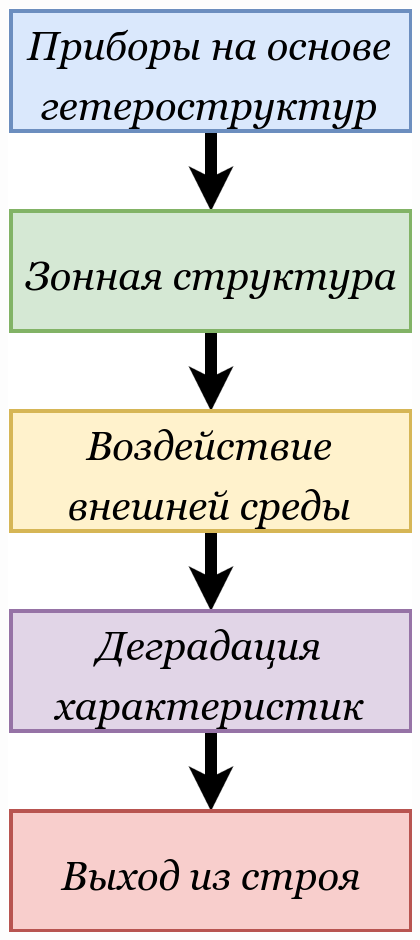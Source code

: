 \documentclass[10pt,pdf,hyperref={unicode},aspectratio={169}]{beamer}
\begin{document}
\begin{frame}
\begin{columns}
\begin{center}
			\includegraphics[width=\textwidth]{assets/Trouble}

\end{center}
\end{columns}
\end{frame}
\end{document}
